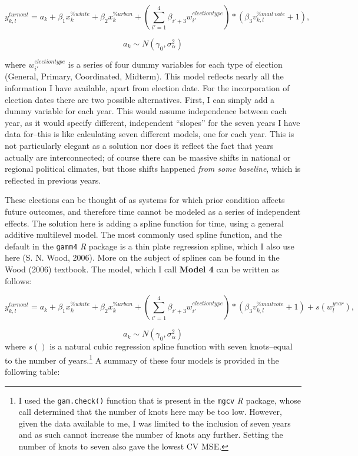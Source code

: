\documentclass[12pt,twoside]{reedthesis}
\begin{document}
  \begin{equation} \tag{Model 3}
  y^{turnout}_{k,l} = a_{k} + \beta_{1}x_k^{\% white} + \beta_{2}x_k^{\% urban} + (\sum_{i'=1}^{4}\beta_{i'+3}w_{i'}^{election type})*(\beta_3v_{k,l}^{\% mail~vote} + 1),
  \end{equation}
  
  \[a_{k} \sim N(\gamma_0, \sigma_{\alpha}^2)\]
  
  where \(w_{i'}^{election type}\) is a series of four dummy variables for
  each type of election (General, Primary, Coordinated, Midterm). This
  model reflects nearly all the information I have available, apart from
  election date. For the incorporation of election dates there are two
  possible alternatives. First, I can simply add a dummy variable for each
  year. This would assume independence between each year, as it would
  specify different, independent ``slopes'' for the seven years I have
  data for--this is like calculating seven different models, one for each
  year. This is not particularly elegant as a solution nor does it reflect
  the fact that years actually are interconnected; of course there can be
  massive shifts in national or regional political climates, but those
  shifts happened \emph{from some baseline}, which is reflected in
  previous years.
  
  These elections can be thought of as systems for which prior condition
  affects future outcomes, and therefore time cannot be modeled as a
  series of independent effects. The solution here is adding a spline
  function for time, using a general additive multilevel model. The most
  commonly used spline function, and the default in the \texttt{gamm4}
  \textit{R} package is a thin plate regression spline, which I also use
  here (S. N. Wood, 2006). More on the subject of splines can be found in
  the Wood (2006) textbook. The model, which I call \textbf{Model 4} can
  be written as follows:
  
  \begin{equation}\tag{Model 4}
  y^{turnout}_{k,l} = a_{k} + \beta_{1}x_k^{\% white} + \beta_{2}x_k^{\% urban} + (\sum_{i'=1}^{4}\beta_{i'+3}w_{i'}^{election type})*(\beta_3v_{k,l}^{\% mail vote} + 1) + s(w^{year}_{l}),
  \end{equation}
  
  \[a_{k} \sim N(\gamma_0, \sigma_{\alpha}^2)\] where \(s()\) is a natural
  cubic regression spline function with seven knots--equal to the number
  of years.\footnote{I used the \texttt{gam.check()} function that is
    present in the \texttt{mgcv} \textit{R} package, whose call determined
    that the number of knots here may be too low. However, given the data
    available to me, I was limited to the inclusion of seven years and as
    such cannot increase the number of knots any further. Setting the
    number of knots to seven also gave the lowest CV MSE.} A summary of
  these four models is provided in the following table:
  
\end{document}
